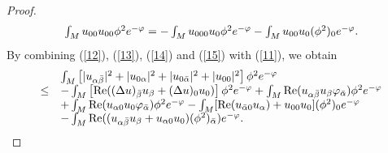 \documentclass[10pt,a4paper]{amsart}
\begin{document}
\begin{proof}
\begin{equation}
\begin{array}
[c]{c}%
\int_{M}u_{00}u_{00}\phi^{2}e^{-\varphi}=-\int_{M}u_{000}u_{0}\phi
^{2}e^{-\varphi}-\int_{M}u_{00}u_{0}(\phi^{2})_{0}e^{-\varphi}.
\end{array}
\label{15}%
\end{equation}
By combining (\ref{12}), (\ref{13}), (\ref{14}) and (\ref{15}) with
(\ref{11}), we obtain%
\begin{equation}%
\begin{array}
[c]{ll}
& \int_{M}\left[  |u_{\alpha\bar{\beta}}|^{2}+|u_{0\alpha}|^{2}+|u_{0\bar
{\alpha}}|^{2}+|u_{00}|^{2}\right]  \phi^{2}e^{-\varphi}\\
\leq & -\int_{M}\left[  \mathrm{\operatorname{Re}}((\Delta u)_{\bar{\beta}%
}u_{\beta}+(\Delta u)_{0}u_{0})\right]  \phi^{2}e^{-\varphi}+\int
_{M}\operatorname{Re}(u_{\alpha\bar{\beta}}u_{\beta}\varphi_{\bar{\alpha}%
})\phi^{2}e^{-\varphi}\\
& +\int_{M}\operatorname{Re}(u_{\alpha0}u_{0}\varphi_{\bar{\alpha}})\phi
^{2}e^{-\varphi}-\int_{M}[\mathrm{\operatorname{Re}}(u_{\bar{\alpha}%
0}u_{\alpha})+u_{00}u_{0}](\phi^{2})_{0}e^{-\varphi}\\
& -\int_{M}\operatorname{Re}((u_{\alpha\bar{\beta}}u_{\beta}+u_{\alpha0}%
u_{0})(\phi^{2})_{\bar{\alpha}})e^{-\varphi}.
\end{array}
\label{16}%
\end{equation}



\end{proof}
\end{document}
